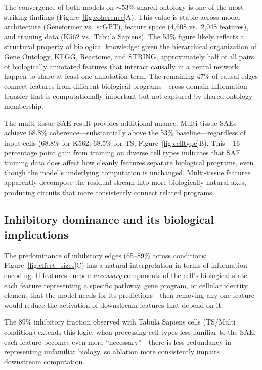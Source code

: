 \documentclass[onecolumn]{article}
\begin{document}
The convergence of both models on ${\sim}53\%$ shared ontology is one of the most striking findings (Figure~\ref{fig:coherence}A). This value is stable across model architecture (Geneformer vs.\ scGPT), feature space (4,608 vs.\ 2,048 features), and training data (K562 vs.\ Tabula Sapiens). The 53\% figure likely reflects a structural property of biological knowledge: given the hierarchical organization of Gene Ontology, KEGG, Reactome, and STRING, approximately half of all pairs of biologically annotated features that interact causally in a neural network happen to share at least one annotation term. The remaining 47\% of causal edges connect features from different biological programs---cross-domain information transfer that is computationally important but not captured by shared ontology membership.

The multi-tissue SAE result provides additional nuance. Multi-tissue SAEs achieve 68.8\% coherence---substantially above the 53\% baseline---regardless of input cells (68.8\% for K562, 68.5\% for TS; Figure~\ref{fig:celltype}B). This $+$16 percentage point gain from training on diverse cell types indicates that SAE training data does affect how cleanly features separate biological programs, even though the model's underlying computation is unchanged. Multi-tissue features apparently decompose the residual stream into more biologically natural axes, producing circuits that more consistently connect related programs.

\subsection{Inhibitory dominance and its biological implications}

The predominance of inhibitory edges (65--89\% across conditions; Figure~\ref{fig:effect_sizes}C) has a natural interpretation in terms of information encoding. If features encode \emph{necessary} components of the cell's biological state---each feature representing a specific pathway, gene program, or cellular identity element that the model needs for its predictions---then removing any one feature would reduce the activation of downstream features that depend on it.

The 89\% inhibitory fraction observed with Tabula Sapiens cells (TS/Multi condition) extends this logic: when processing cell types less familiar to the SAE, each feature becomes even more ``necessary''---there is less redundancy in representing unfamiliar biology, so ablation more consistently impairs downstream computation.
\end{document}

